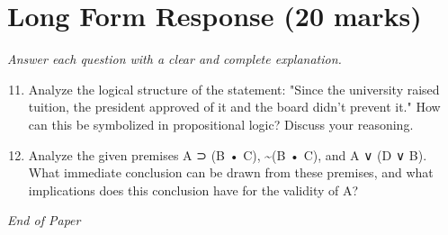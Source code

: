 \documentclass[12pt]{article}
\begin{document}
\section*{Long Form Response (20 marks)}
\textit{Answer each question with a clear and complete explanation.}
\begin{enumerate}[label=\arabic*.]
\setcounter{enumi}{10}
\item Analyze the logical structure of the statement: "Since the university raised tuition, the president approved of it and the board didn't prevent it." How can this be symbolized in propositional logic? Discuss your reasoning.
\item Analyze the given premises A ⊃ (B • C), \textasciitilde{}(B • C), and A ∨ (D ∨ B). What immediate conclusion can be drawn from these premises, and what implications does this conclusion have for the validity of A?
\end{enumerate}

\vfill
\noindent\textit{End of Paper}
\end{document}
